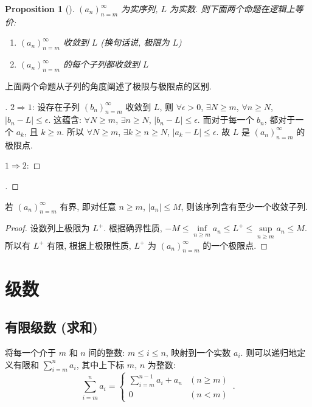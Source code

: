 \documentclass[UTF8]{ctexart}
\theoremstyle{mystyle}
\newtheorem{proposition}{Proposition}[section]
\theoremstyle{myremark}
\theoremstyle{plain}
\begin{document}
\begin{proposition}[] \label{b}
    $ (a_n)_{n = m}^\infty $ 为实序列, $ L $ 为实数. 则下面两个命题在逻辑上等价:
    \begin{enumerate}
        \item $ (a_n)_{n = m}^\infty $ 收敛到 $ L $ (换句话说, 极限为 $ L $)
        \item $ (a_n)_{n = m}^\infty $ 的每个子列都收敛到 $ L $
    \end{enumerate}
\end{proposition}

上面两个命题从子列的角度阐述了极限与极限点的区别.

\begin{proof}[]
    $ 2 \Longrightarrow 1 $: 设存在子列 $ (b_n)_{n = m}^\infty $ 收敛到 $ L $, 则 $ \forall \epsilon > 0 $, $ \exists N \geqslant m $, $ \forall n \geqslant N $, $ |b_n - L| \leqslant \epsilon $. 这蕴含: $ \forall N \geqslant m $, $ \exists n \geqslant N $, $ |b_n - L| \leqslant \epsilon $. 而对于每一个 $ b_n $, 都对于一个 $ a_k $, 且 $ k \geqslant n $. 所以 $ \forall N \geqslant m $, $ \exists k \geqslant n \geqslant N $, $ |a_k - L| \leqslant \epsilon $. 故 $ L $ 是 $ (a_n)_{n = m}^\infty $ 的极限点.

    $ 1 \Longrightarrow 2 $: 
\end{proof}

\begin{proof}[]
    
\end{proof}

\begin{theorem}
    若 $ (a_n)_{n = m}^\infty $ 有界, 即对任意 $ n \geqslant m $, $ |a_n| \leqslant M $, 则该序列含有至少一个收敛子列.
\end{theorem}

\begin{proof}
    设数列上极限为 $ L^+ $. 根据确界性质, $ -M \leqslant \inf\limits_{n \geqslant m} a_n \leqslant L^+ \leqslant \sup\limits_{n \geqslant m} a_n \leqslant M $. 所以有 $ L^+ $ 有限, 根据上极限性质, $ L^+ $ 为 $ (a_n)_{n = m}^\infty $ 的一个极限点.
\end{proof}

\section{级数}
\subsection{有限级数 (求和)}
将每一个介于 $ m $ 和 $ n $ 间的整数: $ m \leqslant i \leqslant n $, 映射到一个实数 $ a_i $. 则可以递归地定义有限和 $\displaystyle \sum_{i = m}^{n} a_i $, 其中上下标 $ m $, $ n $ 为整数:
\[ 
    \sum_{i = m}^{n} a_i = \begin{cases} \displaystyle
        \sum_{i = m}^{n - 1} a_i + a_n & (n \geqslant m) \\
        0 & (n < m) 
    \end{cases}\,.
\]
\end{document}
